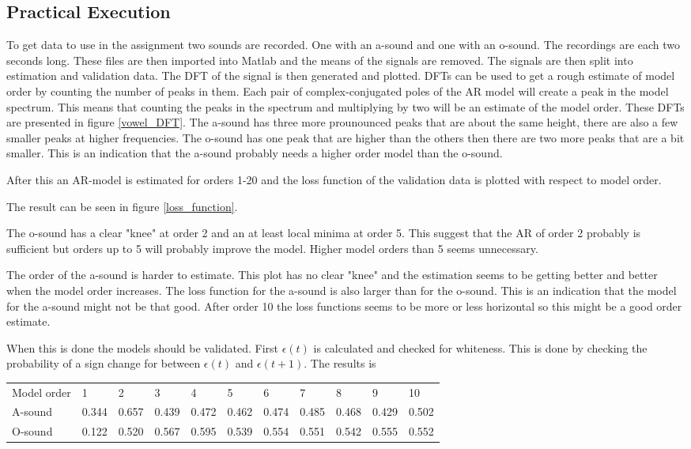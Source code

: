 \documentclass[12pt]{article}
\begin{document}
\subsection{Practical Execution}
To get data to use in the assignment two sounds are recorded. One with an a-sound and one with an o-sound.
The recordings are each two seconds long.
These files are then imported into Matlab and the means of the signals are removed.
The signals are then split into estimation and validation data.
The DFT of the signal is then generated and plotted.
DFTs can be used to get a rough estimate of model order by counting the number of peaks in them.
Each pair of complex-conjugated poles of the AR model will create a peak in the model spectrum.
This means that counting the peaks in the spectrum and multiplying by two will be an estimate of the model order.
These DFTs are presented in figure \ref{vowel_DFT}.
The a-sound has three more prounounced peaks that are about the same height, there are also a few smaller peaks at higher frequencies.
The o-sound has one peak that are higher than the others then there are two more peaks that are a bit smaller.
This is an indication that the a-sound probably needs a higher order model than the o-sound.

After this an AR-model is estimated for orders 1-20 and the loss function of the validation data is plotted with respect to model order.

The result can be seen in figure \ref{loss_function}. 

The o-sound has a clear "knee" at order 2 and an at least local minima at order 5.
This suggest that the AR of order 2 probably is sufficient but orders up to 5 will probably improve the model.
Higher model orders than 5 seems unnecessary.

The order of the a-sound is harder to estimate.
This plot has no clear "knee" and the estimation seems to be getting better and better when the model order increases.
The loss function for the a-sound is also larger than for the o-sound.
This is an indication that the model for the a-sound might not be that good.
After order 10 the loss functions seems to be more or less horizontal so this might be a good order estimate.

When this is done the models should be validated.
First $\epsilon(t)$ is calculated and checked for whiteness.
This is done by checking the probability of a sign change for between $\epsilon(t)$ and $\epsilon(t+1)$.
The results is

\begin{tabular}{l|l|l|l|l|l|l|l|l|l|l}
  \hline
  Model order & 1 & 2 & 3 & 4 & 5 & 6 & 7 & 8 & 9 & 10 \\
  A-sound & 0.344 & 0.657 & 0.439 & 0.472 & 0.462 & 0.474 & 0.485 & 0.468 & 0.429 & 0.502 \\
  O-sound & 0.122 & 0.520 & 0.567 & 0.595 & 0.539 & 0.554 & 0.551 & 0.542 & 0.555 & 0.552 \\
\end{tabular}
\end{document}
